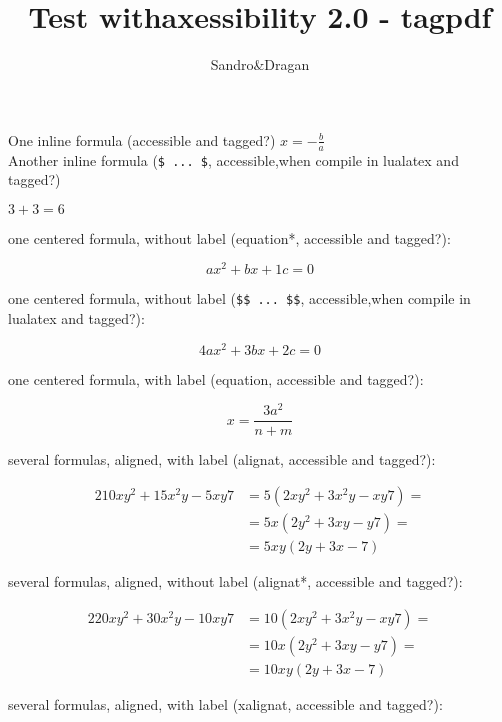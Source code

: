\documentclass{article}
\title{Test withaxessibility 2.0 - tagpdf}
\author{Sandro\&Dragan}
\date{}
\begin{document}
\pagestyle{empty}



\bigskip
One inline formula (accessible and tagged?)
 \( x= - \frac{b}{a} \) \\

Another inline formula (\verb|$ ... $|, accessible,when compile in lualatex and tagged?)

$3 + 3 = 6$\\

one centered formula, without label (equation*, accessible and tagged?):

\begin{equation*}
a x^2 + b x + 1 c = 0
\end{equation*}

one centered formula, without label (\verb|$$ ... $$|, accessible,when compile in lualatex and tagged?):

$$
4a x^2 +3 b x + 2 c = 0
$$

one centered formula, with label (equation, accessible and tagged?):

\begin{equation}
x=\frac{3a^2}{n+m}
\end{equation}

several formulas, aligned, with label (alignat, accessible and tagged?):

\begin{alignat}{2}
10xy^2+15x^2y-5xy7 & =5\left(2xy^2+3x^2y-xy7\right) = \\
 & = 5x\left(2y^2+3xy-y7\right) = \\
 & = 5xy\left(2y+3x-7\right)
\end{alignat}

several formulas, aligned, without label (alignat*, accessible and tagged?):

\begin{alignat*}{2}
20xy^2+30x^2y-10xy7 & =10\left(2xy^2+3x^2y-xy7\right) = \\
 & = 10x\left(2y^2+3xy-y7\right) = \\
 & = 10xy\left(2y+3x-7\right)
\end{alignat*}

several formulas, aligned, with label (xalignat, accessible and tagged?):
\end{document}
